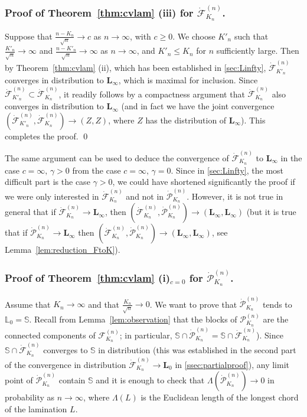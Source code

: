 \documentclass[AHL,XML,longabstracts,Unicode]{cedram}
\def\S{\mathbb{S}}
\def\FFF{\mathcal F}
\def\FKn{\mathcal{F}^{(n)}_{K_{n}}}
\def\PKn{\mathcal{P}^{(n)}_{K_{n}}}
\def\dFKn{\dot{\mathcal{F}}^{(n)}_{K_{n}}}
\def\dPKn{\dot{\mathcal{P}}^{(n)}_{K_{n}}}
\begin{document}
\subsubsection{Proof of  Theorem~\ref{thm:cvlam} (iii) for $ \dFKn$.}
\label{sssec:iiiF}
Suppose that $ \frac{n-K_{n}}{\sqrt{n}} \rightarrow c$ as $n \rightarrow \infty$, with $c \geq 0$. We choose $K'_{n}$ such that $ \frac{K'_{n}}{\sqrt{n}} \rightarrow \infty$ and $ \frac{n-K'_{n}}{\sqrt{n}} \rightarrow \infty$ as $n \rightarrow \infty$, and $K'_{n} \leq K_{n}$ for $n$ sufficiently large. Then by  Theorem~\ref{thm:cvlam} (ii), which has been established in \cref{sec:Linfty}, $ \dot{\FFF}^{(n)}_{K'_{n}}$ converges in distribution to $\mathbf{L}_{\infty}$, which is maximal for inclusion. Since  $ \dot{\FFF}^{(n)}_{K'_{n}}\subset\dFKn$, it readily follows by a compactness argument that $ \dFKn$ also converges in distribution to $\mathbf{L}_{\infty}$ (and in fact we have the joint convergence $ (\dot{\FFF}^{(n)}_{K'_{n}},\dFKn) \to (Z,Z)$, where $Z$ has the distribution of $\mathbf{L}_{\infty}$). This completes the proof. \qed

\begin{remark}
  The same argument can be used to deduce the convergence of $\dFKn$ to $\mathbf L_\infty$ in the case
  $c=\infty,\, \gamma>0$ from the case $c=\infty,\, \gamma=0$.
  Since in \cref{sec:Linfty}, the most difficult part is the case $\gamma>0$,
  we could have shortened significantly the proof if we were only interested in $\dFKn$
  and not in $\dPKn$. However, it is not true in general that  if $\dFKn \rightarrow \mathbf{L}_{\infty}$, then    $(\dFKn,\dPKn) \rightarrow ( \mathbf{L}_{\infty}, \mathbf{L}_{\infty})$ (but it is true that if $\dPKn \rightarrow \mathbf{L}_{\infty}$ then $(\dFKn,\dPKn) \rightarrow ( \mathbf{L}_{\infty}, \mathbf{L}_{\infty})$, see Lemma~\ref{lem:reduction_FtoK}).
\end{remark}





\subsubsection{Proof of Theorem~\ref{thm:cvlam} (i)$_{c=0}$ for $ \dPKn$.}
\label{sssec:P0}

Assume that $K_{n} \rightarrow \infty$ and that $\frac{K_n}{\sqrt{n}} \to 0$.
We want to prove that $\dPKn$ tends to $\mathbb{L}_0=\S$.
Recall from Lemma~\ref{lem:observation} that
the blocks of $\PKn$ are the connected components of $\FKn$; in particular, $ \S \cap \dPKn= \S \cap \dFKn$).
Since $\S \cap \dFKn$ converges to $\S$ in distribution
(this was established in the second part of the convergence in distribution
$\dFKn \rightarrow \mathbf{L}_0$ in \cref{ssec:partialproof}),
any limit point of $\dPKn$ contain $\S$ and
it is enough to check that
$\Lambda(\dPKn) \rightarrow 0$  in probability as $n \rightarrow \infty$,
where $\Lambda(L)$ is the Euclidean length of the longest chord of the lamination $L$.
\end{document}
